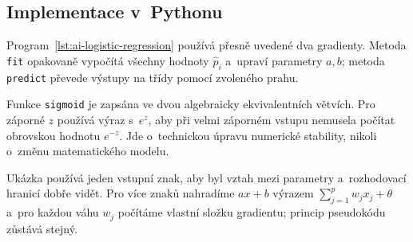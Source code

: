 \subsection{Implementace v~Pythonu}

Program~\ref{lst:ai-logistic-regression} používá přesně uvedené dva gradienty. Metoda \texttt{fit} opakovaně vypočítá všechny hodnoty \(\hat p_i\) a~upraví parametry \(a,b\); metoda \texttt{predict} převede výstupy na třídy pomocí zvoleného prahu.

Funkce \texttt{sigmoid} je zapsána ve dvou algebraicky ekvivalentních větvích. Pro záporné \(z\) používá výraz s~\(e^z\), aby při velmi záporném vstupu nemusela počítat obrovskou hodnotu \(e^{-z}\). Jde o~technickou úpravu numerické stability, nikoli o~změnu matematického modelu.



Ukázka používá jeden vstupní znak, aby byl vztah mezi parametry a~rozhodovací hranicí dobře vidět. Pro více znaků nahradíme \(ax+b\) výrazem \(\sum_{j=1}^{p}w_jx_j+\theta\) a~pro každou váhu \(w_j\) počítáme vlastní složku gradientu; princip pseudokódu zůstává stejný.
